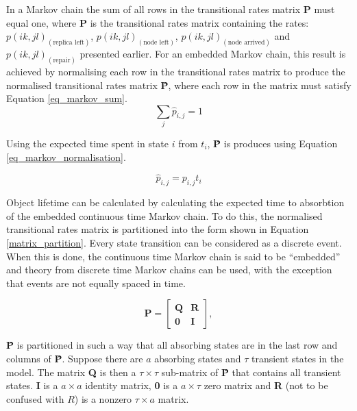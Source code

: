 \documentclass[10pt,a4paper,conference]{IEEEtran}
\begin{document}
In a Markov chain the sum of all rows in the transitional rates matrix \textbf{P} must equal one, where \textbf{P} is the transitional rates matrix containing the rates: $p(i k,j l)_{(\textrm{replica left})}$, $p(i k,j l)_{(\textrm{node left})}$, $p(i k,j l)_{(\textrm{node arrived})}$ and $p(i k,j l)_{(\textrm{repair})}$ presented earlier. For an embedded Markov chain, this result is achieved by normalising each row in the transitional rates matrix to produce the normalised transitional rates matrix \textbf{\^{P}}, where each row in the matrix must satisfy Equation \eqref{eq_markov_sum}.
%
\begin{equation} \label{eq_markov_sum}
    \sum_{j} \hat{p}_{i, j} = 1
\end{equation}

Using the expected time spent in state $i$ from $t_i$, \textbf{\^{P}} is produces using Equation \eqref{eq_markov_normalisation}.

\begin{equation} \label{eq_markov_normalisation}
    \hat{p}_{i, j} = p_{i, j} t_i
\end{equation}

Object lifetime can be calculated by calculating the expected time to absorbtion of the embedded continuous time Markov chain. To do this, the normalised transitional rates matrix is partitioned into the form shown in Equation \eqref{matrix_partition}. Every state transition can be considered as a discrete event. When this is done, the continuous time Markov chain is said to be ``embedded'' and theory from discrete time Markov chains can be used, with the exception that events are not equally spaced in time.

\begin{equation} \label{matrix_partition}
    \textbf{\^{P}} = \left[\begin{array}{c|c}
                   \textbf{Q} & \textbf{R} \\
                   \hline
                   \textbf{0} & \textbf{I}
                 \end{array}\right],
\end{equation}

\textbf{\^{P}} is partitioned in such a way that all absorbing states are in the last row and columns of \textbf{\^{P}}. Suppose there are $a$ absorbing states and $\tau$ transient states in the model. The matrix \textbf{Q} is then a $\tau\times\tau$ sub-matrix of \textbf{\^{P}} that contains all transient states. \textbf{I} is a $a \times a$ identity matrix, \textbf{0} is a $a\times\tau$ zero matrix and \textbf{R} (not to be confused with $R$) is a nonzero $\tau\times a$ matrix.
\end{document}
